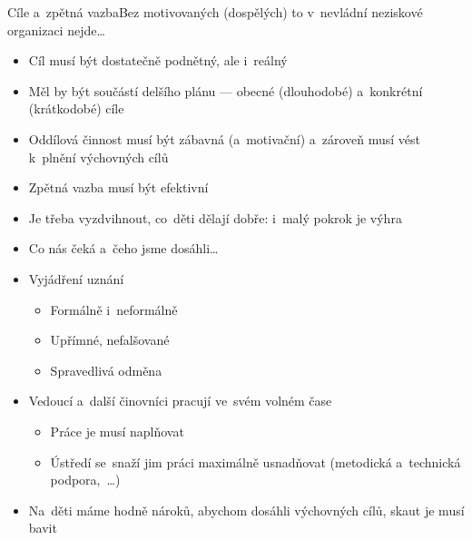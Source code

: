 \documentclass[compress, ucs, xelatex, 11pt, xcolor=dvipsnames, print, aspectratio=169,
	hyperref={
		bookmarks=true,
		unicode=true,
		colorlinks=true,
		pdftitle={Skautska vychovna metoda},
		plainpages=false,
		pdfauthor={Vojtech Zeisek},
		pdfsubject={Skautska vychovna metoda a jeji vyvoj za posledni stoleti a desetileti},
		pdfcreator={XeLaTeX},
		pdfkeywords={Junak, Pedagogika, Skaut, Skauting, Vychovna metoda},
		linkcolor=Red, %
		anchorcolor=ForestGreen, %
		citecolor=ForestGreen, %
		filecolor=ForestGreen, %
		menucolor=ForestGreen, %
		urlcolor=Sepia, %
		pdftex},
	url={hyphens, lowtilde} %
	]{beamer}
\begin{document}
\begin{frame}{Cíle a~zpětná vazba}{Bez motivovaných (dospělých) to v~nevládní neziskové organizaci nejde\ldots}
	\begin{multicols}{2}
		\begin{itemize}
			\item Cíl musí být dostatečně podnětný, ale i~reálný
			\item Měl by být součástí delšího plánu --- obecné (dlouhodobé) a~konkrétní (krátkodobé) cíle
			\item Oddílová činnost musí být zábavná (a~motivační) a~zároveň musí vést k~plnění výchovných cílů
			\item Zpětná vazba musí být efektivní
			\item Je třeba vyzdvihnout, co~děti dělají dobře: i~malý pokrok je výhra
			\item Co nás čeká a~čeho jsme dosáhli\ldots
			\item Vyjádření uznání
			\begin{itemize}
				\item Formálně i~neformálně
				\item Upřímné, nefalšované
				\item Spravedlivá odměna
			\end{itemize}
		\end{itemize}
	\end{multicols}
	\begin{itemize}
		\item Vedoucí a~další činovníci pracují ve~svém volném čase
		\begin{itemize}
			\item Práce je musí naplňovat
			\item Ústředí se~snaží jim práci maximálně usnadňovat (metodická a~technická podpora,~\ldots)
		\end{itemize}
		\item Na~děti máme hodně nároků, abychom dosáhli výchovných cílů, skaut je musí bavit
	\end{itemize}
\end{frame}
\end{document}
